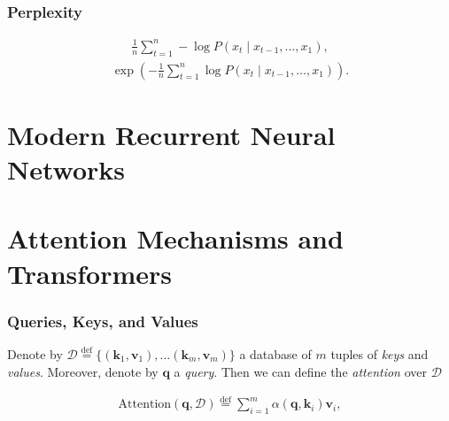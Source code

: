 \documentclass[a4paper,12pt]{article}
\theoremstyle{definition}
\begin{document}
\subsubsection*{Perplexity}
\begin{align*}
    \frac{1}{n} \sum_{t=1}^n -\log P(x_t \mid x_{t-1}, \ldots, x_1),
\end{align*}
\begin{align*}
    \exp\left(-\frac{1}{n} \sum_{t=1}^n \log P(x_t \mid x_{t-1}, \ldots, x_1)\right).
\end{align*}
\section{Modern Recurrent Neural Networks}

\section{Attention Mechanisms and Transformers}
\subsubsection*{Queries, Keys, and Values}
Denote by $\mathcal{D} \stackrel{\mathrm{def}}{=} \{(\mathbf{k}_1, \mathbf{v}_1), \ldots (\mathbf{k}_m, \mathbf{v}_m)\}$ a database of $m$ tuples of \emph{keys} and \emph{values}.
Moreover, denote by $\mathbf{q}$ a \emph{query}. Then we can define the \emph{attention} over $\mathcal{D}$

\begin{align*}
    \mathrm{Attention}(\mathbf{q}, \mathcal{D}) \stackrel{\mathrm{def}}{=} \sum_{i=1}^m \alpha(\mathbf{q}, \mathbf{k}_i) \mathbf{v}_i,
\end{align*}
\end{document}
